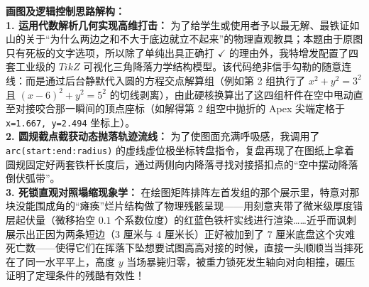 \begin{center}
\end{center}

\vspace{0.6cm}

{\small\color{blue!70!black}
\textbf{画图及逻辑控制思路解构：}\\
\textbf{1. 运用代数解析几何实现高维打击：} 为了给学生或使用者予以最无解、最铁证如山的关于“为什么两边之和不大于底边就立不起来”的物理直观教具；本题由于原图只有死板的文字选项，所以除了单纯出具正确打 $\checkmark$ 的理由外，我特增发配置了四套工业级的 $TikZ$ 可视化三角降落力学结构模型。该代码绝非信手勾勒的随意连线：而是通过后台静默代入圆的方程交点解算组（例如第 2 组执行了 $x^2+y^2=3^2$ 且 $(x-6)^2+y^2=5^2$ 的切线剥离），由此硬核换算出了这四组杆件在空中甩动直至对接咬合那一瞬间的顶点座标（如解得第 2 组空中抛折的 Apex 尖端定格于 \texttt{x=1.667, y=2.494} 坐标上）。\\
\textbf{2. 圆规截点截获动态抛落轨迹流线：} 为了使图面充满呼吸感，我调用了 \texttt{arc(start:end:radius)} 的虚线虚位极坐标转盘指令，复盘再现了在图纸上拿着圆规固定好两套铁杆长度后，通过两侧向内降落寻找对接搭扣点的“空中摆动降落倒伏弧带”。\\
\textbf{3. 死锁直观对照塌缩现象学：} 在绘图矩阵排阵左首发组的那个展示里，特意对那块没能围成角的“瘫痪”烂片结构做了物理残骸呈现——用刻意夹带了微米级厚度错层起伏量（微移抬空 $0.1$ 个系数位度）的红蓝色铁杆实线进行渲染……近乎而讽刺展示出正因为两条短边（$3$ 厘米与 $4$ 厘米长）正好被加到了 $7$ 厘米底盘这个灾难死亡数——使得它们在挥落下坠想要试图高高对接的时候，直接一头顺顺当当摔死在了同一水平平上，高度 $y$ 当场暴毙归零，被重力锁死发生轴向对向相撞，碾压证明了定理条件的残酷有效性！
}

